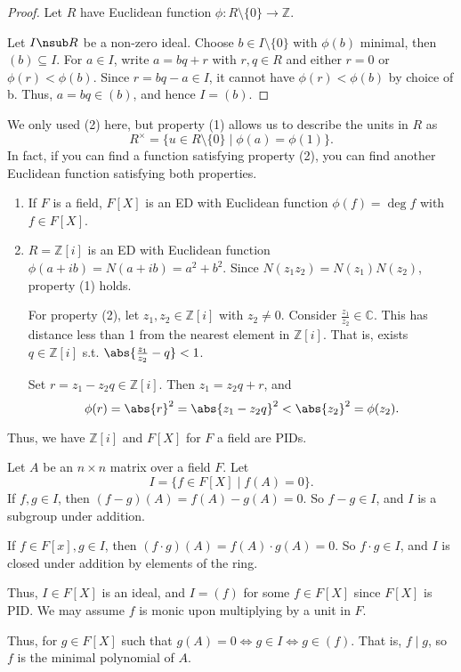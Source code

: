 \begin{proof}
    Let \(R\) have Euclidean function \(\phi: R \setminus \{0\}\to \mathbb{Z}\).

    Let \(I \nsub R\) be a non-zero ideal. Choose \(b \in I\setminus \{0\}\) with \(\phi(b)\) minimal, then \((b) \subseteq I\). For \(a \in I\), write \(a = bq + r\) with \(r,q \in R\) and either \(r = 0\) or \(\phi(r) < \phi(b)\). Since \(r = bq - a \in I\), it cannot have \(\phi(r) < \phi(b)\) by choice of b. Thus, \(a = bq \in (b)\), and hence \(I = (b)\).
\end{proof}
\begin{remark}
    We only used (2) here, but property (1) allows us to describe the units in \(R\) as
    \[
        R^\times = \{u \in R\setminus \{0\} \mid \phi(a) = \phi(1)\}.
    \]
    In fact, if you can find a function satisfying property (2), you can find another Euclidean function satisfying both properties.
\end{remark}
\begin{example}
    \leavevmode
    \begin{enumerate}
        \item If \(F\) is a field, \(F[X]\) is an ED with Euclidean function \(\phi(f) = \deg f\) with \(f \in F[X]\).
        \item \(R = \mathbb{Z}[i]\) is an ED with Euclidean function \(\phi(a + ib) = N(a + ib) = a^2 + b^2\). Since \(N(z_{1}z_2) = N(z_1)N(z_2)\), property (1) holds.
        
        For property (2), let \(z_1, z_2 \in \mathbb{Z}[i]\) with \(z_2 \neq 0\). Consider \(\frac{z_1}{z_2}\in \mathbb{C}\). This has distance less than 1 from the nearest element in \(\mathbb{Z}[i]\). That is, exists \(q \in \mathbb{Z}[i]\) s.t. \(\abs{\frac{z_1}{z_2}-q}<1 \).

        Set \(r = z_1 - z_{2}q \in \mathbb{Z}[i]\). Then \(z_1 = z_2 q + r\), and
        \[
            \phi(r) = \abs{r}^2 = \abs{z_1 - z_2 q}^2 < \abs{z_2}^2 = \phi(z_2).
        \]
    \end{enumerate}
    Thus, we have \(\mathbb{Z}[i]\) and \(F[X]\) for \(F\) a field are PIDs.
\end{example}
\begin{example}
    Let \(A\) be an \(n \times n\) matrix over a field \(F\). Let
    \[I = \{f \in F[X]\mid f(A) = 0\}.\]
    If \(f, g\in I\), then \((f-g)(A) = f(A) - g(A) = 0\). So \(f-g \in I\), and \(I\) is a subgroup under addition.

    If \(f\in F[x], g\in I\), then \((f\cdot g)(A) = f(A) \cdot g(A) = 0\). So \(f\cdot g \in I\), and \(I\) is closed under addition by elements of the ring.

    Thus, \(I \in F[X]\) is an ideal, and \(I = (f)\) for some \(f \in F[X]\) since \(F[X]\) is PID. We may assume \(f\) is monic upon multiplying by a unit in \(F\).

    Thus, for \(g \in F[X]\) such that \(g(A) = 0 \iff g \in I \iff g \in (f)\). That is, \(f \mid g\), so \(f\) is the minimal polynomial of \(A\).
\end{example}
